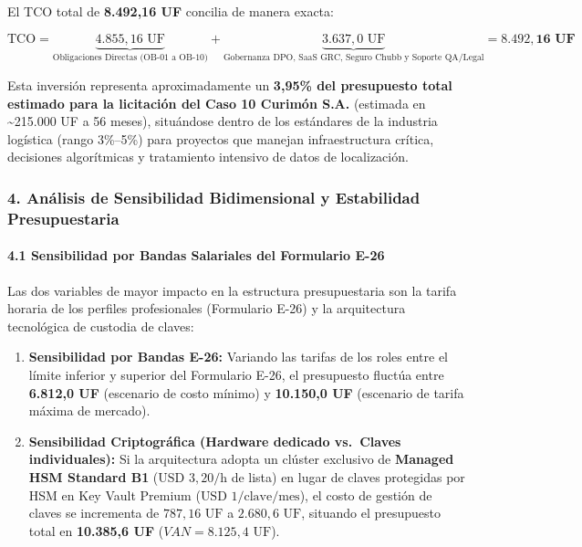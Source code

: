 El TCO total de \textbf{8.492,16 UF} concilia de manera exacta:

\[\text{TCO} = \underbrace{4.855,16\text{ UF}}_{\text{Obligaciones Directas (OB-01 a OB-10)}} + \underbrace{3.637,0\text{ UF}}_{\text{Gobernanza DPO, SaaS GRC, Seguro Chubb y Soporte QA/Legal}} = \mathbf{8.492,16\text{ UF}}\]

Esta inversión representa aproximadamente un \textbf{3,95\% del presupuesto total estimado para la licitación del Caso 10 Curimón S.A.} (estimada en \textasciitilde215.000 UF a 56 meses), situándose dentro de los estándares de la industria logística (rango 3\%--5\%) para proyectos que manejan infraestructura crítica, decisiones algorítmicas y tratamiento intensivo de datos de localización.

\subsubsection{4. Análisis de Sensibilidad Bidimensional y Estabilidad Presupuestaria}\label{anuxe1lisis-de-sensibilidad-bidimensional-y-estabilidad-presupuestaria}

\paragraph{4.1 Sensibilidad por Bandas Salariales del Formulario E-26}\label{sensibilidad-por-bandas-salariales-del-formulario-e-26}

Las dos variables de mayor impacto en la estructura presupuestaria son la tarifa horaria de los perfiles profesionales (Formulario E-26) y la arquitectura tecnológica de custodia de claves:

\begin{enumerate}
\def\labelenumi{\arabic{enumi}.}
\tightlist
\item
  \textbf{Sensibilidad por Bandas E-26:} Variando las tarifas de los roles entre el límite inferior y superior del Formulario E-26, el presupuesto fluctúa entre \textbf{6.812,0 UF} (escenario de costo mínimo) y \textbf{10.150,0 UF} (escenario de tarifa máxima de mercado).
\item
  \textbf{Sensibilidad Criptográfica (Hardware dedicado vs.~Claves individuales):} Si la arquitectura adopta un clúster exclusivo de \textbf{Managed HSM Standard B1} (\(\text{USD } 3,20\text{/h}\) de lista) en lugar de claves protegidas por HSM en Key Vault Premium (\(\text{USD } 1\text{/clave/mes}\)), el costo de gestión de claves se incrementa de \(787,16\text{ UF}\) a \(2.680,6\text{ UF}\), situando el presupuesto total en \textbf{10.385,6 UF} (\(VAN = 8.125,4\text{ UF}\)).
\end{enumerate}

